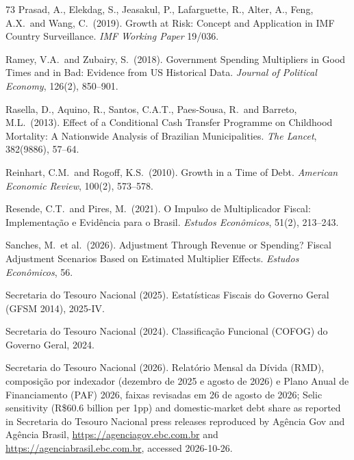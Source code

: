\documentclass[11pt,a4paper]{article}
\begin{document}
\begin{thebibliography}{73}
 Prasad, A., Elekdag, S., Jeasakul, P., Lafarguette, R., Alter, A., Feng, A.X.\ and Wang, C.\ (2019). Growth at Risk: Concept and Application in IMF Country Surveillance. \textit{IMF Working Paper} 19/036.

 Ramey, V.A.\ and Zubairy, S.\ (2018). Government Spending Multipliers in Good Times and in Bad: Evidence from US Historical Data. \textit{Journal of Political Economy}, 126(2), 850--901.

 Rasella, D., Aquino, R., Santos, C.A.T., Paes-Sousa, R.\ and Barreto, M.L.\ (2013). Effect of a Conditional Cash Transfer Programme on Childhood Mortality: A Nationwide Analysis of Brazilian Municipalities. \textit{The Lancet}, 382(9886), 57--64.

 Reinhart, C.M.\ and Rogoff, K.S.\ (2010). Growth in a Time of Debt. \textit{American Economic Review}, 100(2), 573--578.

 Resende, C.T.\ and Pires, M.\ (2021). O Impulso de Multiplicador Fiscal: Implementa\c{c}\~ao e Evid\^encia para o Brasil. \textit{Estudos Econ\^omicos}, 51(2), 213--243.

 Sanches, M.\ et al.\ (2026). Adjustment Through Revenue or Spending? Fiscal Adjustment Scenarios Based on Estimated Multiplier Effects. \textit{Estudos Econ\^omicos}, 56.

 Secretaria do Tesouro Nacional (2025). Estat\'isticas Fiscais do Governo Geral (GFSM 2014), 2025-IV.

 Secretaria do Tesouro Nacional (2024). Classifica\c{c}\~ao Funcional (COFOG) do Governo Geral, 2024.

 Secretaria do Tesouro Nacional (2026). Relat\'orio Mensal da D\'ivida (RMD), composi\c{c}\~ao por indexador (dezembro de 2025 e agosto de 2026) e Plano Anual de Financiamento (PAF) 2026, faixas revisadas em 26 de agosto de 2026; Selic sensitivity (R\$60.6 billion per 1pp) and domestic-market debt share as reported in Secretaria do Tesouro Nacional press releases reproduced by Ag\^encia Gov and Ag\^encia Brasil, \url{https://agenciagov.ebc.com.br} and \url{https://agenciabrasil.ebc.com.br}, accessed 2026-10-26.


\end{thebibliography}
\end{document}
